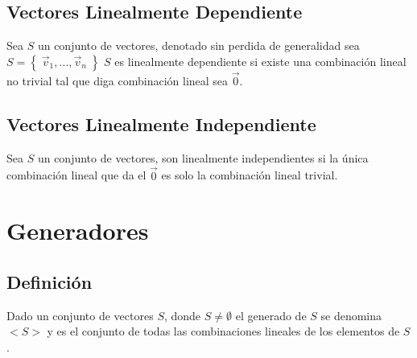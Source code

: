\documentclass[12pt, fleqn]{report}                             %
\theoremstyle{break}                                            %
\newcommand{\Set}[1]    {\left\{ \; #1 \; \right\}}             %
\begin{document}
            \subsection{Vectores Linealmente Dependiente}

                Sea $S$ un conjunto de vectores, denotado sin perdida de generalidad
                sea $S = \Set{\vec v_1, \dots, \vec v_n}$ $S$ es linealmente dependiente
                si existe una combinación lineal no trivial tal que diga combinación lineal
                sea $\vec 0$.

            \subsection{Vectores Linealmente Independiente}

                Sea $S$ un conjunto de vectores, son linealmente independientes si la
                única combinación lineal que da el $\vec 0$ es solo la combinación lineal
                trivial.



        \clearpage
        \section{Generadores}


            \subsection{Definición}

                Dado un conjunto de vectores $S$, donde $S \neq \emptyset$ el generado
                de $S$ se denomina $<S>$ y es el conjunto de todas las combinaciones lineales
                de los elementos de $S$.
\end{document}
